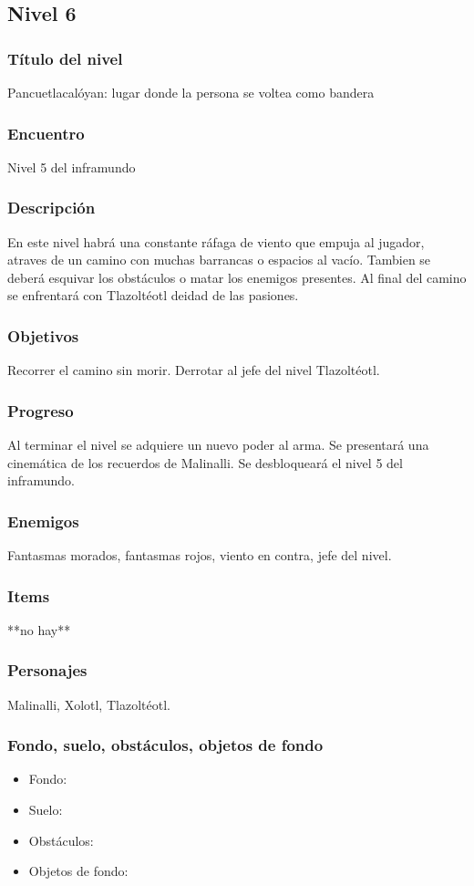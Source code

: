 \documentclass[11pt,letterpaper]{article}
\begin{document}
	
	
		\subsection{Nivel 6}
	\subsubsection{Título del nivel}
	Pancuetlacalóyan: lugar donde la persona se voltea como bandera
	\subsubsection{Encuentro}
	Nivel 5 del inframundo
	\subsubsection{Descripción}
	En este nivel habrá una constante ráfaga de viento que empuja al jugador, atraves de un camino con muchas barrancas o espacios al vacío. Tambien se deberá esquivar los obstáculos o matar los enemigos presentes. Al final del camino se enfrentará con Tlazoltéotl deidad de las pasiones.
	\subsubsection{Objetivos}
	Recorrer el camino sin morir. Derrotar al jefe del nivel Tlazoltéotl.
	\subsubsection{Progreso}
	Al terminar el nivel se adquiere un nuevo poder al arma. Se presentará una cinemática de los recuerdos de Malinalli. Se desbloqueará el nivel 5 del inframundo.
	\subsubsection{Enemigos}
	Fantasmas morados, fantasmas rojos, viento en contra, jefe del nivel.
	\subsubsection{Items}
	**no hay**
	\subsubsection{Personajes}
	Malinalli, Xolotl, Tlazoltéotl.
\subsubsection{Fondo, suelo, obstáculos, objetos de fondo}
\begin{itemize} 
	\item Fondo:
	\item Suelo:
	\item Obstáculos:
	\item Objetos de fondo:
\end{itemize}	
\end{document}
